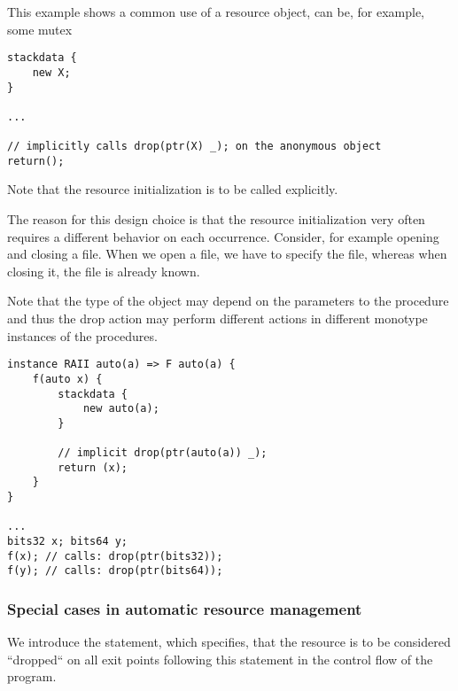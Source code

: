 \begin{ex}
    This example shows a common use of a resource object,  can be, for example, some mutex
    \begin{lstlisting}
stackdata {
    new X;
}

...

// implicitly calls drop(ptr(X) _); on the anonymous object
return();
    \end{lstlisting}
\end{ex}

\begin{remark}
    Note that the resource initialization is to be called explicitly.

    The reason for this design choice is that the resource initialization very often requires a different behavior on each occurrence. Consider, for example opening and closing a file. When we open a file, we have to specify the file, whereas when closing it, the file is already known.
\end{remark}

\begin{remark}
    Note that the type of the object may depend on the parameters to the procedure and thus the drop action may perform different actions in different monotype instances of the procedures.
\end{remark}

\begin{ex}
    \begin{lstlisting}
instance RAII auto(a) => F auto(a) {
    f(auto x) {
        stackdata {
            new auto(a);
        }

        // implicit drop(ptr(auto(a)) _);
        return (x);
    }
}

...
bits32 x; bits64 y;
f(x); // calls: drop(ptr(bits32));
f(y); // calls: drop(ptr(bits64));
    \end{lstlisting}
\end{ex}

\subsubsection{Special cases in automatic resource management}

We introduce the  statement, which specifies, that the resource is to be considered ``dropped`` on all exit points following this statement in the control flow of the program.

